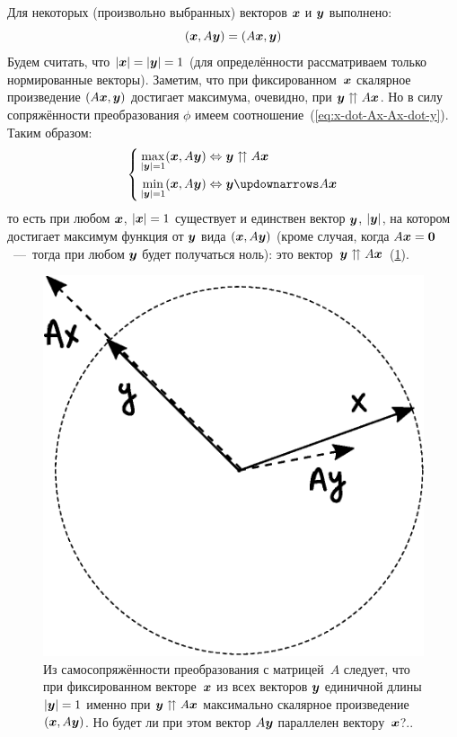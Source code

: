 \documentclass[a4paper,12pt]{article}
\theoremstyle{remark}
\begin{document}
  Для некоторых (произвольно выбранных) векторов $\boldsymbol x$ и $\boldsymbol y$ выполнено:
  \begin{equation}\label{eq:x-dot-Ax-Ax-dot-y}
    (\boldsymbol x, A \boldsymbol y) = (A \boldsymbol x, \boldsymbol y)
  \end{equation}
  Будем считать, что $|\bds x| \hm= |\bds y| \hm= 1$ (для определённости рассматриваем только нормированные векторы).
  Заметим, что при фиксированном~$\boldsymbol x$ скалярное произведение $(A \boldsymbol x, \boldsymbol y)$ достигает максимума, очевидно, при $\bds y \hm\upuparrows A \bds x$.
  Но в силу сопряжённости преобразования $\phi$ имеем соотношение~(\ref{eq:x-dot-Ax-Ax-dot-y}).
  Таким образом:
  \begin{equation}\label{eq:min-max-scalar}
    \left\{
      \begin{aligned}
        &\max_{|\bds y| = 1} (\bds x, A \bds y) \Leftrightarrow \bds y \upuparrows A \bds x\\
        &\min_{|\bds y| = 1} (\bds x, A \bds y) \Leftrightarrow \bds y \updownarrows A \bds x
      \end{aligned}
    \right.
  \end{equation}
  то есть при любом $\boldsymbol x$, $|\bds x| \hm= 1$ существует и единствен вектор $\boldsymbol y$, $|\boldsymbol y|$, на котором достигает максимум функция от $\boldsymbol y$ вида $(\boldsymbol x, A \boldsymbol y)$ (кроме случая, когда $A \bds x \hm= \bds 0$~---~тогда при любом $\boldsymbol y$ будет получаться ноль): это вектор~$\bds y \hm\upuparrows A \bds x$~(\ref{fig:self-adjo-on-the-way-to-understand}).
  
  \begin{figure}
    \centering
    
    \includegraphics[width=0.4\columnwidth]{self-adjo-on-the-way-to-understand}
    
    \caption{Из самосопряжённости преобразования с матрицей~$A$ следует, что при фиксированном векторе~$\boldsymbol x$ из всех векторов $\boldsymbol y$ единичной длины $|\bds y| \hm= 1$ именно при $\bds y \hm\upuparrows A \bds x$ максимально скалярное произведение $(\boldsymbol x, A \boldsymbol y)$. Но будет ли при этом вектор $A \boldsymbol y$ параллелен вектору~$\boldsymbol x$?..}
    \label{fig:self-adjo-on-the-way-to-understand}
  \end{figure}
  
\end{document}
